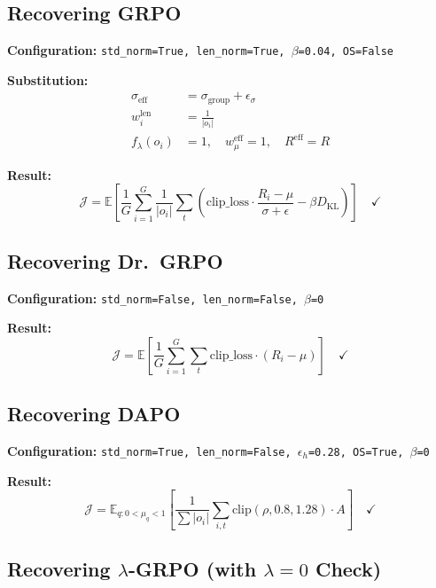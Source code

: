 \documentclass[11pt,a4paper]{article}
\begin{document}
\subsection{Recovering GRPO}

\textbf{Configuration:} \texttt{std\_norm=True, len\_norm=True, $\beta$=0.04, OS=False}

\textbf{Substitution:}
\begin{align}
\sigma_{\text{eff}} &= \sigma_{\text{group}} + \epsilon_\sigma \\
w_i^{\text{len}} &= \frac{1}{|o_i|} \\
f_\lambda(o_i) &= 1, \quad w_\mu^{\text{eff}} = 1, \quad R^{\text{eff}} = R
\end{align}

\textbf{Result:}
\begin{equation}
\mathcal{J} = \mathbb{E} \left[ \frac{1}{G} \sum_{i=1}^{G} \frac{1}{|o_i|} \sum_{t} \left( \text{clip\_loss} \cdot \frac{R_i - \mu}{\sigma + \epsilon} - \beta D_{\text{KL}} \right) \right] \quad \checkmark
\end{equation}

\subsection{Recovering Dr.~GRPO}

\textbf{Configuration:} \texttt{std\_norm=False, len\_norm=False, $\beta$=0}

\textbf{Result:}
\begin{equation}
\mathcal{J} = \mathbb{E} \left[ \frac{1}{G} \sum_{i=1}^{G} \sum_{t} \text{clip\_loss} \cdot (R_i - \mu) \right] \quad \checkmark
\end{equation}

\subsection{Recovering DAPO}

\textbf{Configuration:} \texttt{std\_norm=True, len\_norm=False, $\epsilon_h$=0.28, OS=True, $\beta$=0}

\textbf{Result:}
\begin{equation}
\mathcal{J} = \mathbb{E}_{q: 0 < \mu_q < 1} \left[ \frac{1}{\sum|o_i|} \sum_{i,t} \text{clip}(\rho, 0.8, 1.28) \cdot A \right] \quad \checkmark
\end{equation}

\subsection{Recovering $\lambda$-GRPO (with $\lambda=0$ Check)}
\end{document}
